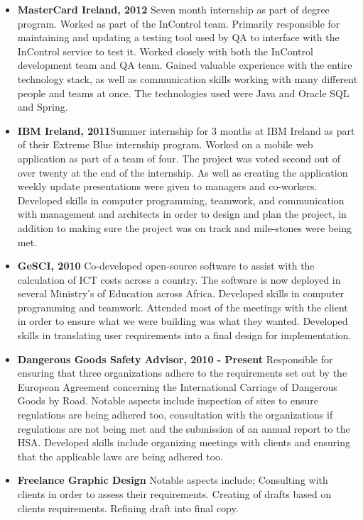 \documentclass{res}
\begin{document}
\begin{resume}
\begin{itemize}
    \item{{\bf MasterCard Ireland, 2012}} Seven month internship as part of degree program. Worked as part of the InControl team. Primarily responsible for maintaining and updating a testing tool used by QA to interface with the InControl service to test it. Worked closely with both the InControl development team and QA team. Gained valuable experience with the entire technology stack, as well as communication skills working with many different people and teams at once. The technologies used were Java and Oracle SQL and Spring.
   
     
    \item{{\bf IBM Ireland, 2011}}Summer internship for 3 months at IBM Ireland as part of their Extreme Blue internship program. Worked on a mobile web application as part of a team of four. The project was voted second out of over twenty at the end of the internship. As well as creating the application weekly update presentations were given to managers and co-workers. Developed skills in computer programming, teamwork, and communication with management and architects in order to design and plan the project, in addition to making sure the project was on track and mile-stones were being met.
    
 
    \item{{\bf GeSCI, 2010}} Co-developed open-source software to assist with the calculation of ICT costs across a country. The software is now deployed in several Ministry's of Education across Africa. Developed skills in computer programming and teamwork. Attended most of the meetings with the client in order to ensure what we were building was what they wanted. Developed skills in translating user requirements into a final design for implementation.

    \item{{\bf Dangerous Goods Safety Advisor, 2010 - Present}} Responsible for ensuring that three organizations adhere to the requirements set out by the European Agreement concerning the International Carriage of Dangerous Goods by Road. Notable aspects include inspection of sites to ensure regulations are being adhered too, consultation with the organizations if regulations are not being met and the submission of an annual report to the HSA. Developed skills include organizing meetings with clients and ensuring that the applicable laws are being adhered too. 
 
    \item{{\bf Freelance Graphic Design}} Notable aspects include; Consulting with clients in order to assess their requirements. Creating of drafts based on clients requirements. Refining draft into final copy.
  \end{itemize}
    

\end{resume}
\end{document}
